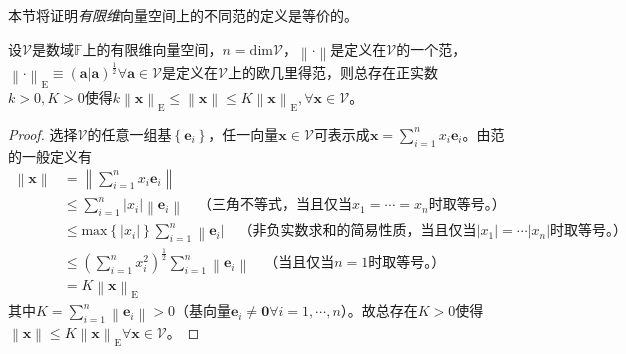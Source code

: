 \documentclass[main.tex]{subfiles}
\begin{document}
本节将证明\emph{有限维}向量空间上的不同范的定义是等价的。

\begin{lemma}\label{lem:A.1}
    设$\mathcal{V}$是数域$\mathbb{F}$上的有限维向量空间，$n=\mathrm{dim}\mathcal{V}$，$\left\|\cdot\right\|$是定义在$\mathcal{V}$的一个范，$\left\|\cdot\right\|_\mathrm{E}\equiv\left(\mathbf{a}|\mathbf{a}\right)^\frac{1}{2}\forall\mathbf{a}\in\mathcal{V}$是定义在$\mathcal{V}$上的欧几里得范，则总存在正实数$k>0,K>0$使得$k\left\|\mathbf{x}\right\|_\mathrm{E}\leq\left\|\mathbf{x}\right\|\leq K\left\|\mathbf{x}\right\|_\mathrm{E},\forall\mathbf{x}\in\mathcal{V}$。
\end{lemma}
\begin{proof}
    选择$\mathcal{V}$的任意一组基$\left\{\mathbf{e}_i\right\}$，任一向量$\mathbf{x}\in\mathcal{V}$可表示成$\mathbf{x}=\sum_{i=1}^nx_i\mathbf{e}_i$。由范的一般定义有
    \begin{align*}
        \left\|\mathbf{x}\right\| & =\left\|\sum_{i=1}^nx_i\mathbf{e}_i\right\|                                                                                                                            \\
                                  & \leq\sum_{i=1}^n\left|x_i\right|\left\|\mathbf{e}_i\right\|\quad\text{（三角不等式，当且仅当}x_1=\cdots=x_n\text{时取等号。）}                                                          \\
                                  & \leq\mathrm{max}\left\{\left|x_i\right|\right\}\sum_{i=1}^n\left\|\mathbf{e}_i\right|\quad\text{（非负实数求和的简易性质，当且仅当}\left|x_1\right|=\cdots\left|x_n\right|\text{时取等号。）} \\
                                  & \leq\left(\sum_{i=1}^nx_i^2\right)^\frac{1}{2}\sum_{i=1}^n\left\|\mathbf{e}_i\right\|\quad\text{（当且仅当}n=1\text{时取等号。）}                                                 \\
                                  & =K\left\|\mathbf{x}\right\|_\mathrm{E}
    \end{align*}
    其中$K=\sum_{i=1}^n\left\|\mathbf{e}_i\right\|>0$（基向量$\mathbf{e}_i\neq\mathbf{0}\forall i=1,\cdots,n$）。故总存在$K>0$使得$\left\|\mathbf{x}\right\|\leq K\left\|\mathbf{x}\right\|_\mathrm{E}\forall\mathbf{x}\in\mathcal{V}$。


\end{proof}
\end{document}
